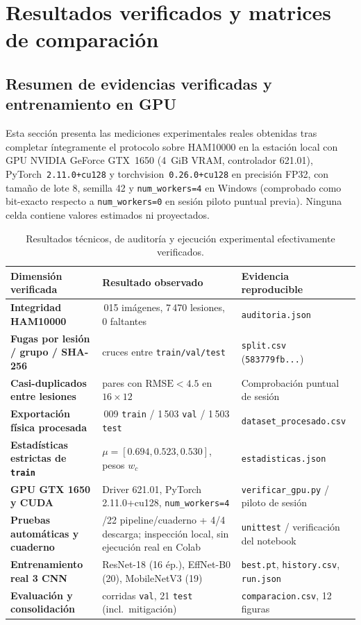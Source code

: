 \FloatBarrier\section{Resultados verificados y matrices de comparación}
\label{sec:resultados}

\subsection{Resumen de evidencias verificadas y entrenamiento en GPU}
Esta sección presenta las mediciones experimentales reales obtenidas tras completar íntegramente el protocolo sobre HAM10000 en la estación local con GPU NVIDIA GeForce GTX~1650 (4~GiB VRAM, controlador 621.01), PyTorch~\texttt{2.11.0+cu128} y torchvision~\texttt{0.26.0+cu128} en precisión FP32, con tamaño de lote 8, semilla 42 y \texttt{num\_workers=4} en Windows (comprobado como bit-exacto respecto a \texttt{num\_workers=0} en sesión piloto puntual previa). Ninguna celda contiene valores estimados ni proyectados.

\begin{table}[htbp]\centering\small
\caption{Resultados técnicos, de auditoría y ejecución experimental efectivamente verificados.}
\begin{tabularx}{\textwidth}{@{}>{\bfseries}p{4.6cm}>{\raggedright\arraybackslash}p{6.5cm}>{\raggedright\arraybackslash}X@{}}
\toprule
\textbf{Dimensión verificada} & \textbf{Resultado observado} & \textbf{Evidencia reproducible} \\ \midrule
Integridad HAM10000 & 10\,015 imágenes, 7\,470 lesiones, 0 faltantes & \texttt{auditoria.json} \\
Fugas por lesión / grupo / SHA-256 & 0 cruces entre \texttt{train/val/test} & \texttt{split.csv} (\texttt{583779fb...}) \\
Casi-duplicados entre lesiones & 0 pares con $\mathrm{RMSE}<4.5$ en $16\times 12$ & Comprobación puntual de sesión \\
Exportación física procesada & 7\,009 \texttt{train} / 1\,503 \texttt{val} / 1\,503 \texttt{test} & \texttt{dataset\_procesado.csv} \\
Estadísticas estrictas de \texttt{train} & $\mu=[0.694,0.523,0.530]$, pesos $w_c$ & \texttt{estadisticas.json} \\
GPU GTX 1650 y CUDA & Driver 621.01, PyTorch 2.11.0+cu128, \texttt{num\_workers=4} & \texttt{verificar\_gpu.py} / piloto de sesión \\
Pruebas automáticas y cuaderno & 22/22 pipeline/cuaderno + 4/4 descarga; inspección local, sin ejecución real en Colab & \texttt{unittest} / verificación del notebook \\
Entrenamiento real 3 CNN & ResNet-18 (16 ép.), EffNet-B0 (20), MobileNetV3 (19) & \texttt{best.pt}, \texttt{history.csv}, \texttt{run.json} \\
Evaluación y consolidación & 3 corridas \texttt{val}, 21 \texttt{test} (incl.\ mitigación) & \texttt{comparacion.csv}, 12 figuras \\
\bottomrule
\end{tabularx}
\end{table}

